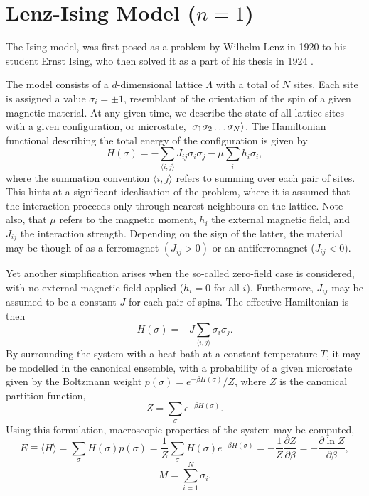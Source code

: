 \documentclass[]{article}
\numberwithin{equation}{section}
\theoremstyle{break}
\newcommand{\bk}{\par\null\par\noindent}
\begin{document}
\section{Lenz-Ising Model ($n=1$)}
The Ising model, was first posed as a problem by Wilhelm Lenz in 1920 \cite{lenz-1920} to his student Ernst Ising, who then solved it as a part of his thesis in 1924 \cite{ising-1925}. 
\bk
The model consists of a $d$-dimensional lattice $\Lambda$ with a total of $N$ sites. Each site is assigned a value $\sigma_i = \pm 1$, resemblant of the orientation of the spin of a given magnetic material. At any given time, we describe the state of all lattice sites with a given configuration, or microstate, $\ket{\sigma_1 \sigma_2 \dots \sigma_N}$. The Hamiltonian functional describing the total energy of the configuration is given by \cite{cipra-1987}
\begin{equation}
 H(\sigma) = -\sum_{\langle i,j\rangle} J_{ij}\sigma_i \sigma_j - \mu \sum_i h_{i}\sigma_i, 
\label{eq:gen_H}
\end{equation}
where the summation convention $\langle i,j\rangle$ refers to summing over each pair of sites. This hints at a significant idealisation of the problem, where it is assumed that the interaction proceeds only through nearest neighbours on the lattice. Note also, that $\mu$ refers to the magnetic moment, $h_i$ the external magnetic field, and $J_{ij}$ the interaction strength. Depending on the sign of the latter, the material may be though of as a ferromagnet $(J_{ij} > 0)$ or an antiferromagnet ($J_{ij} < 0$).
\bk
Yet another simplification arises when the so-called zero-field case is considered, with no external magnetic field applied ($h_i = 0$ for all $i$). Furthermore, $J_{ij}$ may be assumed to be a constant $J$ for each pair of spins. The effective Hamiltonian is then
\begin{equation}
 H(\sigma) = -J \sum_{\langle i, j \rangle} \sigma_i\sigma_j.
\label{eq:red_H}
\end{equation}
By surrounding the system with a heat bath at a constant temperature $T$, it may be modelled in the canonical ensemble, with a probability of a given microstate given by the Boltzmann weight $p(\sigma) = e^{-\beta H(\sigma)}/Z$, where $Z$ is the canonical partition function,
\begin{equation}
Z = \sum_{\sigma} e^{-\beta H(\sigma)}.
\label{eq:partition}
\end{equation}
Using this formulation, macroscopic properties of the system may be computed,
\begin{equation}
E \equiv \langle H \rangle = \sum_{\sigma}H(\sigma) p(\sigma) = \frac{1}{Z}\sum_{\sigma}H(\sigma)e^{-\beta H(\sigma)} = -\frac{1}{Z}\frac{\partial Z}{\partial \beta} = -\frac{\partial \ln Z}{\partial \beta},
\label{eq:avg_E}
\end{equation}
\begin{equation}
M = \sum_{i=1}^{N} \sigma_i.
\label{eq:magnetisation}
\end{equation}
\end{document}
